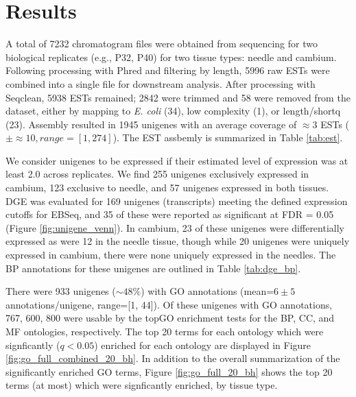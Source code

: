 \documentclass[11pt]{article}
\begin{document}
\section*{Results}

A total of 7232 chromatogram files were obtained from sequencing for
two biological replicates (e.g., P32, P40) for two tissue types:
needle and cambium.  Following processing with Phred and filtering by
length, 5996 raw ESTs were combined into a single file for downstream
analysis.  After processing with Seqclean, 5938 ESTs remained; 2842
were trimmed and 58 were removed from the dataset, either by mapping
to \textit{E. coli} (34), low complexity (1), or length/shortq (23).
Assembly resulted in 1945 unigenes with an average coverage of
$\approx{3}$ ESTs ($\pm \approx{10}, range=[1,274]$). The EST assbemly 
is summarized in Table \ref{tab:est}.

We consider unigenes to be expressed if their estimated level of expression was
at least 2.0 across replicates.  We find 255 unigenes exclusively expressed in
cambium, 123 exclusive to needle, and 57 unigenes expressed in both tissues. DGE
was evaluated for 169 unigenes (transcripts) meeting the defined expression
cutoffs for EBSeq, and 35 of these were reported as significant at FDR = 0.05
(Figure \ref{fig:unigene_venn}).  In cambium, 23 of these unigenes were
differentially expressed as were 12 in the needle tissue, though while 20
unigenes were uniquely expressed in cambium, there were none uniquely expressed
in the needles.  The BP annotations for these unigenes are outlined in Table
\ref{tab:dge_bp}.

There were 933 unigenes ($\sim 48\%$) with GO annotations (mean=$6 \pm
5$ annotations/unigene, range=[1, 44]). Of these unigenes with GO
annotations, 767, 600, 800 were usable by the topGO enrichment tests
for the BP, CC, and MF ontologies, respectively.  The top 20 terms for
each ontology which were signficantly ($q < 0.05$) enriched for each
ontology are displayed in Figure \ref{fig:go_full_combined_20_bh}.  In
addition to the overall summarization of the significantly enriched GO
terms, Figure \ref{fig:go_full_20_bh} shows the top 20 terms (at most) 
which were signficantly enriched, by tissue type.



\end{document}
